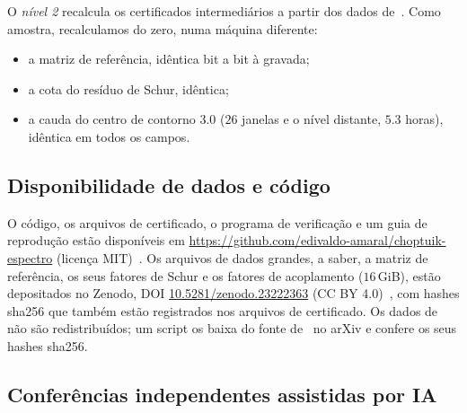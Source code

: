 O \emph{nível 2} recalcula os certificados intermediários a partir dos dados de~\cite{RT2019}. Como amostra, recalculamos
do zero, numa máquina diferente:
\begin{itemize}[leftmargin=*]
\item a matriz de referência, idêntica bit a bit à gravada;
\item a cota do resíduo de Schur, idêntica;
\item a cauda do centro de contorno $3.0$ ($26$ janelas e o nível distante, $5.3$ horas), idêntica em todos os campos.
\end{itemize}

\subsection{Disponibilidade de dados e código}\label{sec:computation-data}

O código, os arquivos de certificado, o programa de verificação e um guia de reprodução estão disponíveis em
\url{https://github.com/edivaldo-amaral/choptuik-espectro} (licença MIT)~\cite{Repo2026}. Os arquivos de dados grandes, a saber, a matriz
de referência, os seus fatores de Schur e os fatores de acoplamento ($16$\,GiB), estão depositados no Zenodo, DOI
\href{https://doi.org/10.5281/zenodo.23222363}{10.5281/zenodo.23222363} (CC BY 4.0)~\cite{Zenodo2026}, com hashes sha256 que
também estão registrados nos arquivos de certificado. Os dados de~\cite{RT2019} não são redistribuídos; um script os baixa
do fonte de~\cite{RT2019} no arXiv e confere os seus hashes sha256.

\subsection{Conferências independentes assistidas por IA}\label{sec:computation-reviews}

